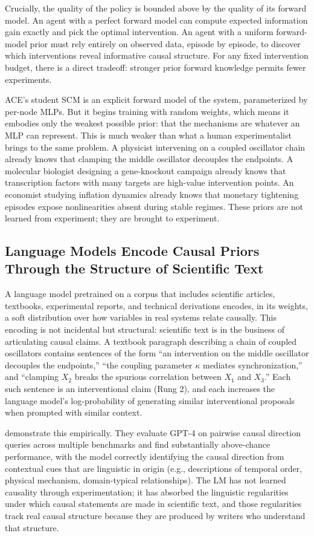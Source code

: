 \documentclass[twoside]{article}
\theoremstyle{plain}
\theoremstyle{definition}
\theoremstyle{remark}
\begin{document}
Crucially, the quality of the policy is bounded above by the quality of its forward model. An agent with a perfect forward model can compute expected information gain exactly and pick the optimal intervention. An agent with a uniform forward-model prior must rely entirely on observed data, episode by episode, to discover which interventions reveal informative causal structure. For any fixed intervention budget, there is a direct tradeoff: stronger prior forward knowledge permits fewer experiments.

ACE's student SCM is an explicit forward model of the system, parameterized by per-node MLPs. But it begins training with random weights, which means it embodies only the weakest possible prior: that the mechanisms are whatever an MLP can represent. This is much weaker than what a human experimentalist brings to the same problem. A physicist intervening on a coupled oscillator chain already knows that clamping the middle oscillator decouples the endpoints. A molecular biologist designing a gene-knockout campaign already knows that transcription factors with many targets are high-value intervention points. An economist studying inflation dynamics already knows that monetary tightening episodes expose nonlinearities absent during stable regimes. These priors are not learned from experiment; they are brought to experiment.

\subsection{Language Models Encode Causal Priors Through the Structure of Scientific Text}

A language model pretrained on a corpus that includes scientific articles, textbooks, experimental reports, and technical derivations encodes, in its weights, a soft distribution over how variables in real systems relate causally. This encoding is not incidental but structural: scientific text is in the business of articulating causal claims. A textbook paragraph describing a chain of coupled oscillators contains sentences of the form ``an intervention on the middle oscillator decouples the endpoints,'' ``the coupling parameter $\kappa$ mediates synchronization,'' and ``clamping $X_2$ breaks the spurious correlation between $X_1$ and $X_3$.'' Each such sentence is an interventional claim (Rung 2), and each increases the language model's log-probability of generating similar interventional proposals when prompted with similar context.

\citet{kiciman2023causal} demonstrate this empirically. They evaluate GPT-4 on pairwise causal direction queries across multiple benchmarks and find substantially above-chance performance, with the model correctly identifying the causal direction from contextual cues that are linguistic in origin (e.g., descriptions of temporal order, physical mechanism, domain-typical relationships). The LM has not learned causality through experimentation; it has absorbed the linguistic regularities under which causal statements are made in scientific text, and those regularities track real causal structure because they are produced by writers who understand that structure.
\end{document}
